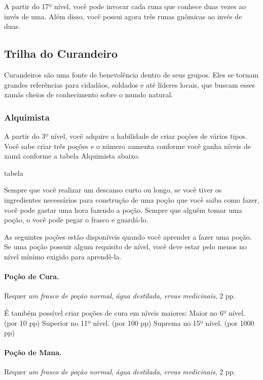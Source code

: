 \begin{multicols}{2}
A partir do 17º nível, você pode invocar cada runa que conhece duas vezes ao
invés de uma. Além disso, você possui agora três runas gnômicas ao invés de
duas.

\subsection*{Trilha do Curandeiro}%

Curandeiros são uma fonte de benevolência dentro de seus grupos. Eles se tornam
grandes referências para cidadãos, soldados e até líderes locais, que buscam
esses xamãs cheios de conhecimento sobre o mundo natural.

\subsubsection*{Alquimista}%

A partir do 3º nível, você adquire a habilidade de criar poções de vários
tipos. Você sabe criar três poções e o número aumenta conforme você ganha níveis
de xamã conforme a tabela Alquimista abaixo.

tabela

Sempre que você realizar um descanso curto ou longo, se você tiver os
ingredientes necessários para construção de uma poção que você saiba como fazer,
você pode gastar uma hora fazendo a poção. Sempre que alguém tomar uma poção, o
você pode pegar o frasco e guardá-lo.

As seguintes poções estão disponíveis quando você aprender a fazer uma poção. Se
uma poção possuir algum requisito de nível, você deve estar pelo menos no nível
mínimo exigido para aprendê-la.

\paragraph{Poção de Cura.} %

Requer \textit{um frasco de poção normal}, \textit{água destilada},
\textit{ervas medicinais}, 2 pp.

É também possível criar poções de cura em níveis maiores: \nl
Maior no 6º nível. (por 10 pp) \nl
Superior no 11º nível. (por 100 pp) \nl
Suprema no 15º nível. (por 1000 pp) \nl

\paragraph{Poção de Mana.}%

Requer \textit{um frasco de poção normal}, \textit{água destilada},
\textit{ervas medicinais}, 2 pp.


\end{multicols}
